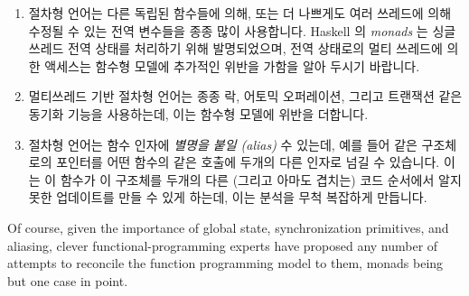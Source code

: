 \fi

\begin{enumerate}
\item	절차형 언어는 다른 독립된 함수들에 의해, 또는 더 나쁘게도 여러 쓰레드에
	의해 수정될 수 있는 전역 변수들을 종종 많이 사용합니다.
	Haskell 의 \emph{monads} 는 싱글 쓰레드 전역 상태를 처리하기 위해
	발명되었으며, 전역 상태로의 멀티 쓰레드에 의한 액세스는 함수형 모델에
	추가적인 위반을 가함을 알아 두시기 바랍니다.
\item	멀티쓰레드 기반 절차형 언어는 종종 락, 어토믹 오퍼레이션, 그리고
	트랜잭션 같은 동기화 기능을 사용하는데, 이는 함수형 모델에 위반을
	더합니다.
\item	절차형 언어는 함수 인자에 \emph{별명을 붙일 (alias)} 수 있는데, 예를
	들어 같은 구조체로의 포인터를 어떤 함수의 같은 호출에 두개의 다른
	인자로 넘길 수 있습니다.
	이는 이 함수가 이 구조체를 두개의 다른 (그리고 아마도 겹치는) 코드
	순서에서 알지 못한 업데이트를 만들 수 있게 하는데, 이는 분석을 무척
	복잡하게 만듭니다.

\iffalse

\item	Procedural languages often make heavy use of global variables,
	which can be updated independently by different
	functions, or, worse yet, by multiple threads.
	Note that Haskell's \emph{monads} were invented to deal with
	single-threaded global state, and that multi-threaded access to
	global state inflicts additional violence on the functional model.
\item	Multithreaded procedural languages often use synchronization
	primitives such as locks, atomic operations, and transactions,
	which inflict added violence upon the functional model.
\item	Procedural languages can \emph{alias} function arguments,
	for example, by passing a pointer to the same structure via two
	different arguments to the same invocation of a given function.
	This can result in the function unknowingly updating that
	structure via two different (and possibly overlapping) code
	sequences, which greatly complicates analysis.

\fi

\end{enumerate}

Of course, given the importance of global state, synchronization
primitives, and aliasing, clever functional-programming experts have
proposed any number of attempts to reconcile the function programming
model to them, monads being but one case in point.

